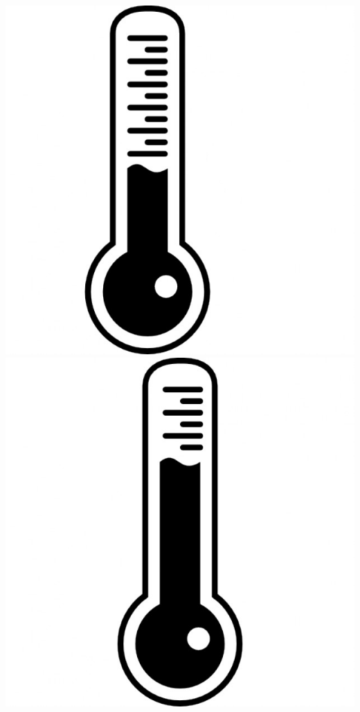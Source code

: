 \documentclass{beamer}
\begin{document}
\begin{frame}

  \includegraphics[scale=0.3]{graphics/thermometer-1.jpg}
  \includegraphics[scale=0.3]{graphics/thermometer-2.jpg}

\end{frame}
\end{document}

